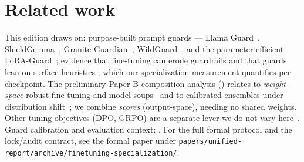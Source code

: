 \documentclass[11pt]{article}
\newcommand{\code}[1]{\texttt{\small #1}}
\begin{document}
\section*{Related work}
This edition draws on: purpose-built prompt guards --- Llama Guard~\cite{inan2023llamaguard},
ShieldGemma~\cite{zeng2024shieldgemma}, Granite Guardian~\cite{padhi2024graniteguardian},
WildGuard~\cite{han2024wildguard}, and the parameter-efficient LoRA-Guard~\cite{elesedy2024loraguard};
evidence that fine-tuning can erode guardrails and that guards lean on surface heuristics
\cite{hsiung2025guardrails,li2026surfaceheuristics,bassani2025robustness}, which our
specialization measurement quantifies per checkpoint. The preliminary Paper B composition analysis ()
relates to \emph{weight-space} robust fine-tuning and model soups~\cite{wortsman2022wiseft,wortsman2022modelsoups}
and to calibrated ensembles under distribution shift~\cite{kumar2022calibrated}; we combine
\emph{scores} (output-space), needing no shared weights. Other tuning objectives (DPO, GRPO) are
a separate lever we do not vary here~\cite{rafailov2023dpo,shao2024deepseekmath,vennemeyer2026objective}.
Guard calibration and evaluation context: \cite{guo2017calibration,liu2025calibration,bassani2024guardbench}.
For the full formal protocol and the lock/audit contract, see the formal paper under \code{papers/unified-report/archive/finetuning-specialization/}.



\end{document}
